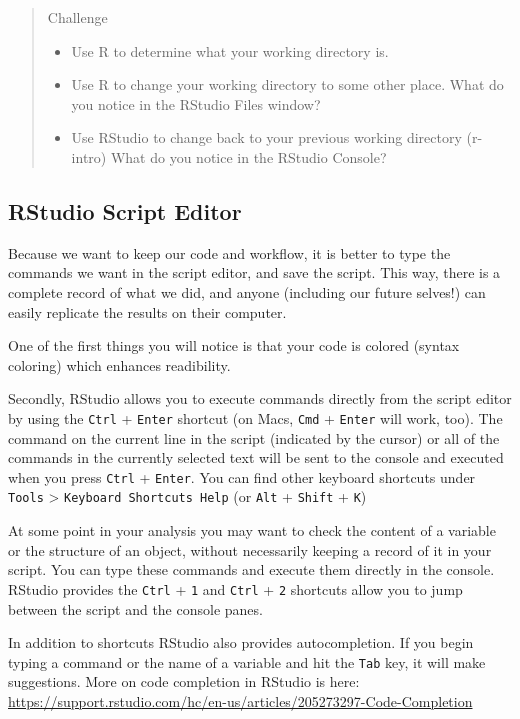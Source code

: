 \documentclass[]{book}
\providecommand{\tightlist}{%
  \setlength{\itemsep}{0pt}\setlength{\parskip}{0pt}}
\theoremstyle{definition}
\theoremstyle{definition}
\theoremstyle{remark}
\begin{document}
\begin{quote}
Challenge

\begin{itemize}
\tightlist
\item
  Use R to determine what your working directory is.
\item
  Use R to change your working directory to some other place. What do
  you notice in the RStudio Files window?
\item
  Use RStudio to change back to your previous working directory
  (r-intro) What do you notice in the RStudio Console?
\end{itemize}
\end{quote}

\subsection{RStudio Script Editor}\label{rstudio-script-editor}

Because we want to keep our code and workflow, it is better to type the
commands we want in the script editor, and save the script. This way,
there is a complete record of what we did, and anyone (including our
future selves!) can easily replicate the results on their computer.

One of the first things you will notice is that your code is colored
(syntax coloring) which enhances readibility.

Secondly, RStudio allows you to execute commands directly from the
script editor by using the \texttt{Ctrl} + \texttt{Enter} shortcut (on
Macs, \texttt{Cmd} + \texttt{Enter} will work, too). The command on the
current line in the script (indicated by the cursor) or all of the
commands in the currently selected text will be sent to the console and
executed when you press \texttt{Ctrl} + \texttt{Enter}. You can find
other keyboard shortcuts under \texttt{Tools} \textgreater{}
\texttt{Keyboard\ Shortcuts\ Help} (or \texttt{Alt} + \texttt{Shift} +
\texttt{K})

At some point in your analysis you may want to check the content of a
variable or the structure of an object, without necessarily keeping a
record of it in your script. You can type these commands and execute
them directly in the console. RStudio provides the \texttt{Ctrl} +
\texttt{1} and \texttt{Ctrl} + \texttt{2} shortcuts allow you to jump
between the script and the console panes.

In addition to shortcuts RStudio also provides autocompletion. If you
begin typing a command or the name of a variable and hit the
\texttt{Tab} key, it will make suggestions. More on code completion in
RStudio is here:
\url{https://support.rstudio.com/hc/en-us/articles/205273297-Code-Completion}
\end{document}
